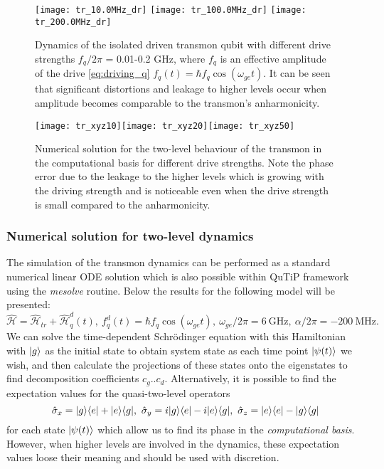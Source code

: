 \documentclass[12pt, twoside]{report}
\DeclarePairedDelimiter\bra{\langle}{\rvert}
\DeclarePairedDelimiter\ket{\lvert}{\rangle}
\numberwithin{equation}{section}
\begin{document}
\begin{figure}[h!]
\centering
\texttt{[image: tr\_10.0MHz\_dr]}
\texttt{[image: tr\_100.0MHz\_dr]}
\texttt{[image: tr\_200.0MHz\_dr]}
\caption{Dynamics of the isolated driven transmon qubit with different drive strengths $f_q/2\pi$ = 0.01-0.2 GHz, where $f_q$ is an effective amplitude of the drive \eqref{eq:driving_q} $f_q (t) = \hbar  f_q \cos(\omega_{ge} t)$. It can be seen that significant distortions and leakage to higher levels occur when amplitude becomes comparable to the transmon's anharmonicity.}
\label{fig:driven_tr}
\end{figure}

\begin{figure}[h!]
\centering
\texttt{[image: tr\_xyz10]}\texttt{[image: tr\_xyz20]}\texttt{[image: tr\_xyz50]}
\caption{Numerical solution for the two-level behaviour of the transmon in the computational basis for different drive strengths. Note the phase error due to the leakage to the higher levels which is growing with the driving strength and is noticeable even when the drive strength is small compared to the anharmonicity.}
\label{fig:xyz_tr}
\end{figure}

\subsubsection{Numerical solution for two-level dynamics}

The simulation of the transmon dynamics can be performed as a standard numerical linear ODE solution which is also possible within QuTiP framework using the \textit{mesolve} routine. Below the results for the following model will be presented:
\[
\mathcal{\hat H} = \mathcal{\hat H}_{tr}  +\mathcal{\hat H}_q^d(t),\ f_q^d(t) =\hbar f_q \cos(\omega_{ge}t),\ \omega_{ge}/2\pi = 6\ \text{GHz},\ \alpha/2\pi = - 200\ \text{MHz}.
\]
We can solve the time-dependent Schrödinger equation with this Hamiltonian with $\ket{g}$ as the initial state to obtain system state as each time point $\ket{\psi(t)}$ we wish, and then calculate the projections of these states onto the eigenstates to find decomposition coefficients $c_{g}..c_{d}$. Alternatively, it is possible to  find the expectation values for the quasi-two-level operators
\[
\hat \sigma_x = \ket{g}\bra{e}+\ket{e}\bra{g},\ \hat\sigma_y = i\ket{g}\bra{e} - i\ket{e}\bra{g},\ \hat\sigma_z  = \ket{e}\bra{e}-\ket{g}\bra{g}
\]
for each state $\ket{\psi(t)}$ which allow us to find its phase in the \textit{computational basis}. However, when higher levels are involved in the dynamics, these expectation values loose their meaning and should be used with discretion.
\end{document}
